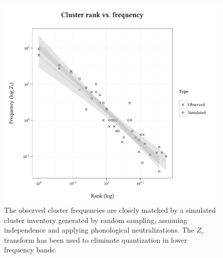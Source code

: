 \begin{figure}
\centering
\includegraphics{sim.pdf}
\caption{The observed cluster frequencies are closely matched by a simulated cluster inventory generated by random sampling, assuming independence and applying phonological neutralizations. The $Z_r$ transform \citep[][29]{Church1991} has been used to eliminate quantization in lower frequency bands.}
\label{sim}
\end{figure}
